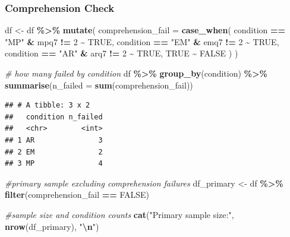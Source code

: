 \documentclass[
]{article}
\newenvironment{Shaded}{\begin{snugshade}}{\end{snugshade}}
\newcommand{\AttributeTok}[1]{\textcolor[rgb]{0.13,0.29,0.53}{#1}}
\newcommand{\CommentTok}[1]{\textcolor[rgb]{0.56,0.35,0.01}{\textit{#1}}}
\newcommand{\ConstantTok}[1]{\textcolor[rgb]{0.56,0.35,0.01}{#1}}
\newcommand{\DecValTok}[1]{\textcolor[rgb]{0.00,0.00,0.81}{#1}}
\newcommand{\FunctionTok}[1]{\textcolor[rgb]{0.13,0.29,0.53}{\textbf{#1}}}
\newcommand{\NormalTok}[1]{#1}
\newcommand{\OtherTok}[1]{\textcolor[rgb]{0.56,0.35,0.01}{#1}}
\newcommand{\SpecialCharTok}[1]{\textcolor[rgb]{0.81,0.36,0.00}{\textbf{#1}}}
\newcommand{\StringTok}[1]{\textcolor[rgb]{0.31,0.60,0.02}{#1}}
\begin{document}
\subsubsection{Comprehension Check}\label{comprehension-check}

\begin{Shaded}
\begin{Highlighting}[]
\NormalTok{df }\OtherTok{\textless{}{-}}\NormalTok{ df }\SpecialCharTok{\%\textgreater{}\%}
  \FunctionTok{mutate}\NormalTok{(}
    \AttributeTok{comprehension\_fail =} \FunctionTok{case\_when}\NormalTok{(}
\NormalTok{      condition }\SpecialCharTok{==} \StringTok{"MP"} \SpecialCharTok{\&}\NormalTok{ mpq7 }\SpecialCharTok{!=} \DecValTok{2} \SpecialCharTok{\textasciitilde{}} \ConstantTok{TRUE}\NormalTok{,}
\NormalTok{      condition }\SpecialCharTok{==} \StringTok{"EM"} \SpecialCharTok{\&}\NormalTok{ emq7 }\SpecialCharTok{!=} \DecValTok{2} \SpecialCharTok{\textasciitilde{}} \ConstantTok{TRUE}\NormalTok{,}
\NormalTok{      condition }\SpecialCharTok{==} \StringTok{"AR"} \SpecialCharTok{\&}\NormalTok{ arq7 }\SpecialCharTok{!=} \DecValTok{2} \SpecialCharTok{\textasciitilde{}} \ConstantTok{TRUE}\NormalTok{,}
      \ConstantTok{TRUE} \SpecialCharTok{\textasciitilde{}} \ConstantTok{FALSE}
\NormalTok{    )}
\NormalTok{  )}

\CommentTok{\# how many failed by condition}
\NormalTok{df }\SpecialCharTok{\%\textgreater{}\%}
  \FunctionTok{group\_by}\NormalTok{(condition) }\SpecialCharTok{\%\textgreater{}\%}
  \FunctionTok{summarise}\NormalTok{(}\AttributeTok{n\_failed =} \FunctionTok{sum}\NormalTok{(comprehension\_fail))}
\end{Highlighting}
\end{Shaded}

\begin{verbatim}
## # A tibble: 3 x 2
##   condition n_failed
##   <chr>        <int>
## 1 AR               3
## 2 EM               2
## 3 MP               4
\end{verbatim}

\begin{Shaded}
\begin{Highlighting}[]
\CommentTok{\#primary sample excluding comprehension failures}
\NormalTok{df\_primary }\OtherTok{\textless{}{-}}\NormalTok{ df }\SpecialCharTok{\%\textgreater{}\%}
  \FunctionTok{filter}\NormalTok{(comprehension\_fail }\SpecialCharTok{==} \ConstantTok{FALSE}\NormalTok{)}

\CommentTok{\#sample size and condition counts}
\FunctionTok{cat}\NormalTok{(}\StringTok{"Primary sample size:"}\NormalTok{, }\FunctionTok{nrow}\NormalTok{(df\_primary), }\StringTok{"}\SpecialCharTok{\textbackslash{}n}\StringTok{"}\NormalTok{)}
\end{Highlighting}
\end{Shaded}
\end{document}
